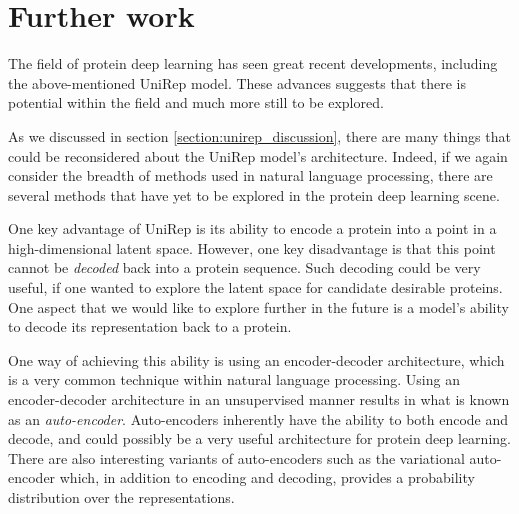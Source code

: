\documentclass[a4paper,12pt]{article}
\begin{document}



\clearpage
\section{Further work}
The field of protein deep learning has seen great recent developments, including the above-mentioned UniRep model. These advances suggests that there is potential within the field and much more still to be explored.

As we discussed in section \ref{section:unirep_discussion}, there are many things that could be reconsidered about the UniRep model's architecture. Indeed, if we again consider the breadth of methods used in natural language processing, there are several methods that have yet to be explored in the protein deep learning scene.

One key advantage of UniRep is its ability to encode a protein into a point in a high-dimensional latent space. However, one key disadvantage is that this point cannot be \textit{decoded} back into a protein sequence. Such decoding could be very useful, if one wanted to explore the latent space for candidate desirable proteins. One aspect that we would like to explore further in the future is a model's ability to decode its representation back to a protein.

One way of achieving this ability is using an encoder-decoder architecture, which is a very common technique within natural language processing. Using an encoder-decoder architecture in an unsupervised manner results in what is known as an \textit{auto-encoder}. Auto-encoders inherently have the ability to both encode and decode, and could possibly be a very useful architecture for protein deep learning. There are also interesting variants of auto-encoders such as the variational auto-encoder which, in addition to encoding and decoding, provides a probability distribution over the representations.
\end{document}
